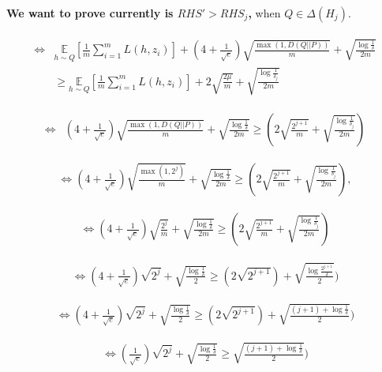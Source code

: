 \documentclass{article}
\begin{document}
\textbf{We want to prove currently is $RHS' > RHS_j$,} when $Q \in \Delta(H_j)$.

\begin{align}
\begin{aligned}
    \iff
    & \underset{h \sim Q}{\mathbb{E}}\left[\frac{1}{m} \sum_{i=1}^{m} L\left(h, z_{i}\right)\right]
    + ( 4 + \frac{1}{\sqrt{e}} )\sqrt{\frac{\max{(1,D(Q||P))}}{m}} + \sqrt{\frac{\log \frac{1}{\delta}}{2 m}} \\
    &\geq \underset{h \sim Q}{\mathbb{E}}\left[\frac{1}{m} \sum_{i=1}^{m} L\left(h, z_{i}\right)\right]+
    2 \sqrt{\frac{2 \mu}{m}}
    +\sqrt{\frac{\log \frac{1}{\delta_j}}{2 m}}
\end{aligned}
\end{align}

\begin{align}
    \iff
    & 
    ( 4 + \frac{1}{\sqrt{e}} )\sqrt{\frac{\max{(1,D(Q||P))}}{m}} + \sqrt{\frac{\log \frac{1}{\delta}}{2 m}} 
    \geq 
    (2 \sqrt{\frac{2^{j+1}}{m}}
    +\sqrt{\frac{\log \frac{1}{\delta_j}}{2 m}})
\end{align}

\begin{align}
    \iff ( 4 + \frac{1}{\sqrt{e}} )\sqrt{\frac{\max{(1, 2^j) }}{m}} + \sqrt{\frac{\log \frac{1}{\delta}}{2 m}} 
    \geq 
    (2 \sqrt{\frac{2^{j+1}}{m}}
    +\sqrt{\frac{\log \frac{1}{\delta_j}}{2 m}}), \label{eq:20}
\end{align}



\begin{align}
    \iff ( 4 + \frac{1}{\sqrt{e}} )\sqrt{\frac{2^j }{m}} + \sqrt{\frac{\log \frac{1}{\delta}}{2 m}} 
    \geq 
    (2 \sqrt{\frac{{2^{j+1}}}{m}}
    +\sqrt{\frac{\log \frac{1}{\delta_j}}{2 m}})
\end{align}


\begin{align}
    \iff ( 4 + \frac{1}{\sqrt{e}} ) \sqrt{2^j}  + \sqrt{\frac{\log \frac{1}{\delta}}{2 }} 
    \geq 
    (2 \sqrt{2^{j+1}})
    +\sqrt{\frac{\log \frac{2^{j+1}}{\delta}}{2 }})
\end{align}


\begin{align}
    \iff ( 4 + \frac{1}{\sqrt{e}} ) \sqrt{2^j} + \sqrt{\frac{\log \frac{1}{\delta}}{2 }} 
    \geq 
    (2 \sqrt{2^{j+1}})
    +\sqrt{\frac{(j+1) + \log \frac{1}{\delta}}{2 }})
\end{align}

\begin{align}
    \iff ( \frac{1}{\sqrt{e}} ) \sqrt{2^j} + \sqrt{\frac{\log \frac{1}{\delta}}{2 }} 
    \geq 
    \sqrt{\frac{(j+1) + \log \frac{1}{\delta}}{2 }}) 
\end{align}
\end{document}
